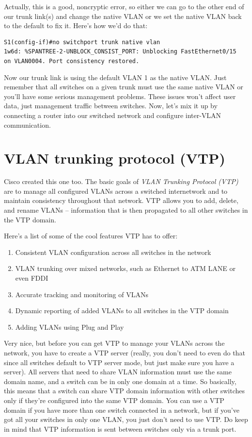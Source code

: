 Actually, this is a good, noncryptic error, so either we can go to the
other end of our trunk link(s) and change the native VLAN or we set the
native VLAN back to the default to fix it. Here's how we'd do that:

\begin{verbatim}
S1(config-if)#no switchport trunk native vlan
1w6d: %SPANTREE-2-UNBLOCK_CONSIST_PORT: Unblocking FastEthernet0/15
on VLAN0004. Port consistency restored.
\end{verbatim}

Now our trunk link is using the default VLAN 1 as the native VLAN.
Just remember that all switches on a given trunk must use the same native VLAN or you'll have some serious management problems.
These issues won't affect user data, just management traffic between switches.
Now, let's mix it up by connecting a router into our switched network and configure inter-VLAN communication.




\section{VLAN trunking protocol (VTP)}

Cisco created this one too. The basic goals of \emph{VLAN Trunking
Protocol (VTP)} are to manage all configured VLANs across a switched
internetwork and to maintain consistency throughout that network. VTP
allows you to add, delete, and rename VLANs -- information that is then
propagated to all other switches in the VTP domain.

Here's a list of some of the cool features VTP has to offer:

\begin{enumerate}
\tightlist
\item
  Consistent VLAN configuration across all switches in the network
\item
  VLAN trunking over mixed networks, such as Ethernet to ATM LANE or
  even FDDI
\item
  Accurate tracking and monitoring of VLANs
\item
  Dynamic reporting of added VLANs to all switches in the VTP domain
\item
  Adding VLANs using Plug and Play
\end{enumerate}

Very nice, but before you can get VTP to manage your VLANs across the
network, you have to create a VTP server (really, you don't need to even
do that since all switches default to VTP server mode, but just make
sure you have a server). All servers that need to share VLAN information
must use the same domain name, and a switch can be in only one domain at
a time. So basically, this means that a switch can share VTP domain
information with other switches only if they're configured into the same
VTP domain. You can use a VTP domain if you have more than one switch
connected in a network, but if you've got
all your switches in
only one VLAN, you just don't need to use VTP. Do keep in mind that VTP
information is sent between switches only via a trunk port.

